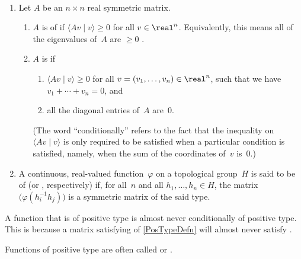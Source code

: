 \begin{defn} \label{PosTypeDefn} \  
\noprelistbreak
	\begin{enumerate}
	\item Let $A$ be an $n \times n$ real symmetric matrix.
		\noprelistbreak
		\begin{enumerate}
		\item \label{PosTypeDefn-Pos}
		$A$ is of  if $\langle Av \mid v \rangle \ge 0$ for all $v \in \real^n$. Equivalently, this means all of the eigenvalues of~$A$ are $\ge 0$ .
		\item  \label{PosTypeDefn-Cond}
		$A$ is  if 
			\begin{enumerate}
			\item $\langle Av \mid v \rangle \ge 0$ for all $v = (v_1,\ldots,v_n) \in \real^n$, such that we have $v_1 + \cdots + v_n = 0$,
			and
			\item  \label{PosTypeDefn-Cond-0}
			all the diagonal entries of~$A$ are~$0$.
			\end{enumerate}
		(The word ``conditionally'' refers to the fact that the inequality on $\langle Av \mid v \rangle$ is only required to be satisfied when a particular condition is satisfied, namely, when the sum of the coordinates of~$v$ is~$0$.)
		\end{enumerate}
	\item A continuous, real-valued function~$\varphi$ on a topological group~$H$ is said to be of  (or , respectively) if, for all~$n$ and all $h_1,\ldots,h_n \in H$, the matrix $\bigl( \varphi(h_i^{-1} h_j ) \bigr)$ is a symmetric matrix of the said type.
	\end{enumerate}
\end{defn}

\begin{warn}
A function that is of positive type is almost never conditionally of positive type. This is because a  matrix satisfying  of \cref{PosTypeDefn}  will almost never satisfy  .
\end{warn}

\begin{terminology} \label{PosDefTerm}
Functions of positive type are often called  or .
\end{terminology}

